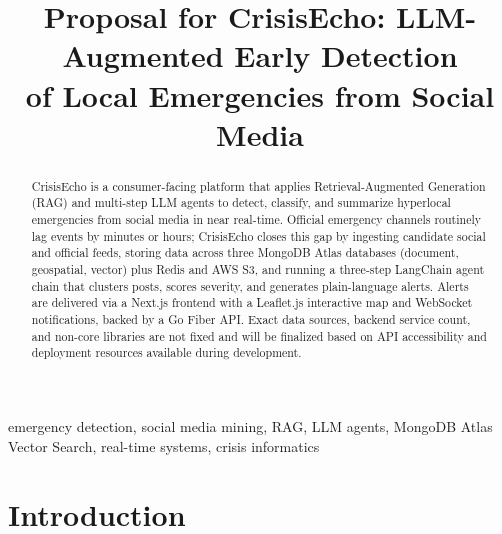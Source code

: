 \documentclass[conference]{IEEEtran}
\begin{document}
\title{Proposal for CrisisEcho: LLM-Augmented Early Detection\\
of Local Emergencies from Social Media}

\author{
\and
{}
\and
{}
\and
{}
\and
{}
}

\maketitle

\begin{abstract}
CrisisEcho is a consumer-facing platform that applies Retrieval-Augmented
Generation (RAG) and multi-step LLM agents to detect, classify, and summarize
hyperlocal emergencies from social media in near real-time. Official emergency
channels routinely lag events by minutes or hours; CrisisEcho closes this gap
by ingesting candidate social and official feeds, storing data across three
MongoDB Atlas databases (document, geospatial, vector) plus Redis and AWS S3,
and running a three-step LangChain agent chain that clusters posts, scores
severity, and generates plain-language alerts. Alerts are delivered via a
Next.js frontend with a Leaflet.js interactive map and WebSocket notifications,
backed by a Go Fiber API. Exact data sources, backend service count, and
non-core libraries are not fixed and will be finalized based on API
accessibility and deployment resources available during development.
\end{abstract}

\begin{IEEEkeywords}
emergency detection, social media mining, RAG, LLM agents, MongoDB Atlas
Vector Search, real-time systems, crisis informatics
\end{IEEEkeywords}

\section{Introduction}
\end{document}
